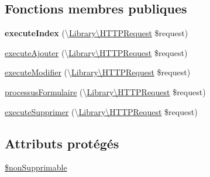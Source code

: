 \subsection*{Fonctions membres publiques}
\begin{DoxyCompactItemize}
\item 
\hypertarget{class_applications_1_1_backend_1_1_modules_1_1_page_archivable_1_1_page_archivable_controller_ac9c6fe801e9ac09e4a395ad64c76ed04}{{\bfseries execute\+Index} (\textbackslash{}\hyperlink{class_library_1_1_h_t_t_p_request}{Library\textbackslash{}\+H\+T\+T\+P\+Request} \$request)}\label{class_applications_1_1_backend_1_1_modules_1_1_page_archivable_1_1_page_archivable_controller_ac9c6fe801e9ac09e4a395ad64c76ed04}

\item 
\hyperlink{class_applications_1_1_backend_1_1_modules_1_1_page_archivable_1_1_page_archivable_controller_adf056b6997127e682bbd4ae668d0a247}{execute\+Ajouter} (\textbackslash{}\hyperlink{class_library_1_1_h_t_t_p_request}{Library\textbackslash{}\+H\+T\+T\+P\+Request} \$request)
\item 
\hyperlink{class_applications_1_1_backend_1_1_modules_1_1_page_archivable_1_1_page_archivable_controller_ae86ff917aafe384e7fb46673719cba62}{execute\+Modifier} (\textbackslash{}\hyperlink{class_library_1_1_h_t_t_p_request}{Library\textbackslash{}\+H\+T\+T\+P\+Request} \$request)
\item 
\hyperlink{class_applications_1_1_backend_1_1_modules_1_1_page_archivable_1_1_page_archivable_controller_a8e3be54836a0615d184b6e518218bda5}{processus\+Formulaire} (\textbackslash{}\hyperlink{class_library_1_1_h_t_t_p_request}{Library\textbackslash{}\+H\+T\+T\+P\+Request} \$request)
\item 
\hyperlink{class_applications_1_1_backend_1_1_modules_1_1_page_archivable_1_1_page_archivable_controller_a6bb898240e821bbbb62bf86cb12a1bc2}{execute\+Supprimer} (\textbackslash{}\hyperlink{class_library_1_1_h_t_t_p_request}{Library\textbackslash{}\+H\+T\+T\+P\+Request} \$request)
\end{DoxyCompactItemize}
\subsection*{Attributs protégés}
\begin{DoxyCompactItemize}
\item 
\hyperlink{class_applications_1_1_backend_1_1_modules_1_1_page_archivable_1_1_page_archivable_controller_a25c6842b81a175d908c8994c883d5fe1}{\$non\+Supprimable}
\end{DoxyCompactItemize}



